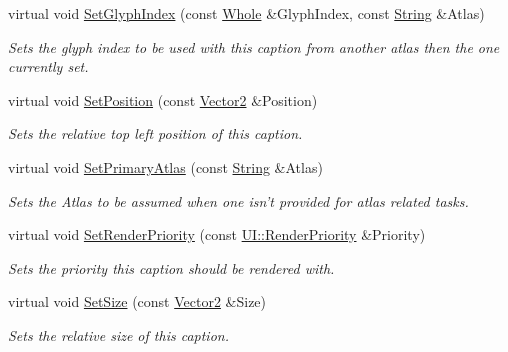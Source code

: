 \begin{DoxyCompactItemize}
virtual void \hyperlink{classMezzanine_1_1UI_1_1Caption_abe41befd65e977a1bb300427d0dd5936}{SetGlyphIndex} (const \hyperlink{namespaceMezzanine_adcbb6ce6d1eb4379d109e51171e2e493}{Whole} \&GlyphIndex, const \hyperlink{namespaceMezzanine_acf9fcc130e6ebf08e3d8491aebcf1c86}{String} \&Atlas)
\begin{DoxyCompactList}\small\item\em Sets the glyph index to be used with this caption from another atlas then the one currently set. \item\end{DoxyCompactList}\item 
virtual void \hyperlink{classMezzanine_1_1UI_1_1Caption_a1db8c2388e76c0cf2d4c017ec44ce6b1}{SetPosition} (const \hyperlink{classMezzanine_1_1Vector2}{Vector2} \&Position)
\begin{DoxyCompactList}\small\item\em Sets the relative top left position of this caption. \item\end{DoxyCompactList}\item 
virtual void \hyperlink{classMezzanine_1_1UI_1_1Caption_a4794ffff86824830fc54fc0aa6feb710}{SetPrimaryAtlas} (const \hyperlink{namespaceMezzanine_acf9fcc130e6ebf08e3d8491aebcf1c86}{String} \&Atlas)
\begin{DoxyCompactList}\small\item\em Sets the Atlas to be assumed when one isn't provided for atlas related tasks. \item\end{DoxyCompactList}\item 
virtual void \hyperlink{classMezzanine_1_1UI_1_1Caption_ad3e5d066b19d56616369632276d8fd38}{SetRenderPriority} (const \hyperlink{namespaceMezzanine_1_1UI_ac4c753eb6b5d66350a243acc9ce54130}{UI::RenderPriority} \&Priority)
\begin{DoxyCompactList}\small\item\em Sets the priority this caption should be rendered with. \item\end{DoxyCompactList}\item 
virtual void \hyperlink{classMezzanine_1_1UI_1_1Caption_a7ab0e51b3dba56d6a9612ff41a1df9e1}{SetSize} (const \hyperlink{classMezzanine_1_1Vector2}{Vector2} \&Size)
\begin{DoxyCompactList}\small\item\em Sets the relative size of this caption. \item\end{DoxyCompactList}\item 

\end{DoxyCompactItemize}
